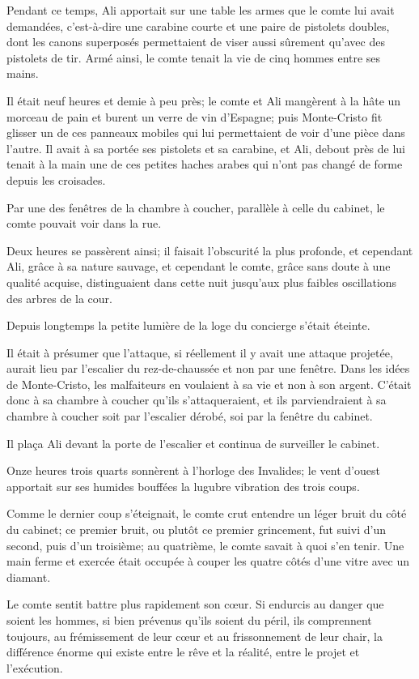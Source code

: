 Pendant ce temps, Ali apportait sur une table les armes que le comte lui avait demandées, c'est-à-dire une carabine courte et une paire de pistolets doubles, dont les canons superposés permettaient de viser aussi sûrement qu'avec des pistolets de tir. Armé ainsi, le comte tenait la vie de cinq hommes entre ses mains. 

Il était neuf heures et demie à peu près; le comte et Ali mangèrent à la hâte un morceau de pain et burent un verre de vin d'Espagne; puis Monte-Cristo fit glisser un de ces panneaux mobiles qui lui permettaient de voir d'une pièce dans l'autre. Il avait à sa portée ses pistolets et sa carabine, et Ali, debout près de lui tenait à la main une de ces petites haches arabes qui n'ont pas changé de forme depuis les croisades. 

Par une des fenêtres de la chambre à coucher, parallèle à celle du cabinet, le comte pouvait voir dans la rue. 

Deux heures se passèrent ainsi; il faisait l'obscurité la plus profonde, et cependant Ali, grâce à sa nature sauvage, et cependant le comte, grâce sans doute à une qualité acquise, distinguaient dans cette nuit jusqu'aux plus faibles oscillations des arbres de la cour. 

Depuis longtemps la petite lumière de la loge du concierge s'était éteinte. 

Il était à présumer que l'attaque, si réellement il y avait une attaque projetée, aurait lieu par l'escalier du rez-de-chaussée et non par une fenêtre. Dans les idées de Monte-Cristo, les malfaiteurs en voulaient à sa vie et non à son argent. C'était donc à sa chambre à coucher qu'ils s'attaqueraient, et ils parviendraient à sa chambre à coucher soit par l'escalier dérobé, soi par la fenêtre du cabinet. 

Il plaça Ali devant la porte de l'escalier et continua de surveiller le cabinet. 

Onze heures trois quarts sonnèrent à l'horloge des Invalides; le vent d'ouest apportait sur ses humides bouffées la lugubre vibration des trois coups. 

Comme le dernier coup s'éteignait, le comte crut entendre un léger bruit du côté du cabinet; ce premier bruit, ou plutôt ce premier grincement, fut suivi d'un second, puis d'un troisième; au quatrième, le comte savait à quoi s'en tenir. Une main ferme et exercée était occupée à couper les quatre côtés d'une vitre avec un diamant. 

Le comte sentit battre plus rapidement son cœur. Si endurcis au danger que soient les hommes, si bien prévenus qu'ils soient du péril, ils comprennent toujours, au frémissement de leur cœur et au frissonnement de leur chair, la différence énorme qui existe entre le rêve et la réalité, entre le projet et l'exécution. 

